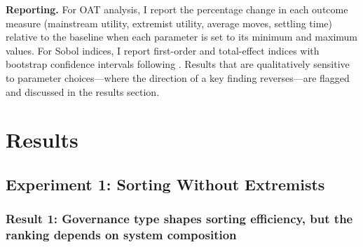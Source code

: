 \documentclass[12pt]{article}
\begin{document}
\textbf{Reporting.} For OAT analysis, I report the percentage change in each outcome measure (mainstream utility, extremist utility, average moves, settling time) relative to the baseline when each parameter is set to its minimum and maximum values. For Sobol indices, I report first-order and total-effect indices with bootstrap confidence intervals following \cite{saltelli2010variance}. Results that are qualitatively sensitive to parameter choices---where the direction of a key finding reverses---are flagged and discussed in the results section.

\section{Results}
\label{sec:results}

% 
%

\subsection{Experiment 1: Sorting Without Extremists}
\label{sec:results_exp1}


\subsubsection{Result 1: Governance type shapes sorting efficiency, but the ranking depends on system composition}
\end{document}
